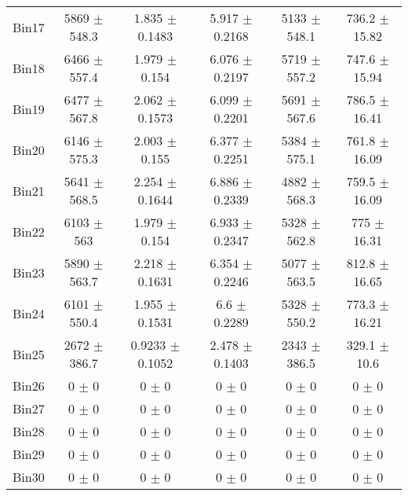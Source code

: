 \begin{tabular}{@{\extracolsep{4pt}}lccccc@{}}
     Bin17 & 5869 $\pm$ 548.3 & 1.835 $\pm$ 0.1483 & 5.917 $\pm$ 0.2168 & 5133 $\pm$ 548.1 & 736.2 $\pm$ 15.82 \\ 
     Bin18 & 6466 $\pm$ 557.4 & 1.979 $\pm$ 0.154 & 6.076 $\pm$ 0.2197 & 5719 $\pm$ 557.2 & 747.6 $\pm$ 15.94 \\ 
     Bin19 & 6477 $\pm$ 567.8 & 2.062 $\pm$ 0.1573 & 6.099 $\pm$ 0.2201 & 5691 $\pm$ 567.6 & 786.5 $\pm$ 16.41 \\ 
     Bin20 & 6146 $\pm$ 575.3 & 2.003 $\pm$ 0.155 & 6.377 $\pm$ 0.2251 & 5384 $\pm$ 575.1 & 761.8 $\pm$ 16.09 \\ 
     Bin21 & 5641 $\pm$ 568.5 & 2.254 $\pm$ 0.1644 & 6.886 $\pm$ 0.2339 & 4882 $\pm$ 568.3 & 759.5 $\pm$ 16.09 \\ 
     Bin22 & 6103 $\pm$ 563 & 1.979 $\pm$ 0.154 & 6.933 $\pm$ 0.2347 & 5328 $\pm$ 562.8 & 775 $\pm$ 16.31 \\ 
     Bin23 & 5890 $\pm$ 563.7 & 2.218 $\pm$ 0.1631 & 6.354 $\pm$ 0.2246 & 5077 $\pm$ 563.5 & 812.8 $\pm$ 16.65 \\ 
     Bin24 & 6101 $\pm$ 550.4 & 1.955 $\pm$ 0.1531 & 6.6 $\pm$ 0.2289 & 5328 $\pm$ 550.2 & 773.3 $\pm$ 16.21 \\ 
     Bin25 & 2672 $\pm$ 386.7 & 0.9233 $\pm$ 0.1052 & 2.478 $\pm$ 0.1403 & 2343 $\pm$ 386.5 & 329.1 $\pm$ 10.6 \\ 
     Bin26 & 0 $\pm$ 0 & 0 $\pm$ 0 & 0 $\pm$ 0 & 0 $\pm$ 0 & 0 $\pm$ 0 \\ 
     Bin27 & 0 $\pm$ 0 & 0 $\pm$ 0 & 0 $\pm$ 0 & 0 $\pm$ 0 & 0 $\pm$ 0 \\ 
     Bin28 & 0 $\pm$ 0 & 0 $\pm$ 0 & 0 $\pm$ 0 & 0 $\pm$ 0 & 0 $\pm$ 0 \\ 
     Bin29 & 0 $\pm$ 0 & 0 $\pm$ 0 & 0 $\pm$ 0 & 0 $\pm$ 0 & 0 $\pm$ 0 \\ 
     Bin30 & 0 $\pm$ 0 & 0 $\pm$ 0 & 0 $\pm$ 0 & 0 $\pm$ 0 & 0 $\pm$ 0 \\ 
\hline\hline
  \end{tabular}
